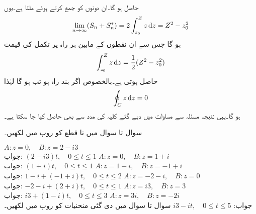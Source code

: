 حاصل ہو گا۔ان دونوں کو جمع کرتے ہوئے  ملتا ہے۔یوں
\begin{align*}
\lim_{n\to \infty} (S_n+S^*_n)=2\int_{z_0}^Z z\dif z=Z^2-z_0^2
\end{align*}
ہو گا  جس سے ان نقطوں کے مابین ہر راہ پر تکمل کی قیمت
\begin{align*}
\int_{z_0}^Z z\dif z=\frac{1}{2} (Z^2-z_0^2)
\end{align*}
حاصل ہوتی ہے۔بالخصوص اگر  بند راہ ہو تب  ہو گا لہٰذا
\begin{align}
\oint_C z\dif z=0
\end{align}
ہو گا۔یہی نتیجہ مسئلہ  سے  مساوات  میں دیے گئے کلیہ کی مدد سے  بھی حاصل کیا جا سکتا ہے۔

سوال  تا سوال  میں  تا  قطع کو  روپ میں لکھیں۔

\quad
$A:z=0,\quad B:z=2-i3$\\
جواب:\quad
$(2-i3)t,\quad 0\le t\le 1$
\quad
$A:z=0,\quad B:z=1+i$\\
جواب:\quad
$(1+i)t,\quad 0\le t\le 1$
\quad
$A:z=1-i,\quad B:z=-1+i$\\
جواب:\quad
$1-i+(-1+i)t,\quad 0\le t\le 2$
\quad
$A:z=-2-i,\quad B:z=0$\\
جواب:\quad
$-2-i+(2+i)t,\quad 0\le t\le 1$
\quad
$A:z=i3,\quad B:z=3$\\
جواب:\quad
$i3+(1-i)t,\quad 0\le t\le 3$
\quad
$A:z=3i,\quad B:z=-2i$\\
جواب:\quad
$i3-it,\quad 0\le t\le 5$
سوال  تا سوال  میں دی گئی منحنیات کو  روپ میں لکھیں۔

